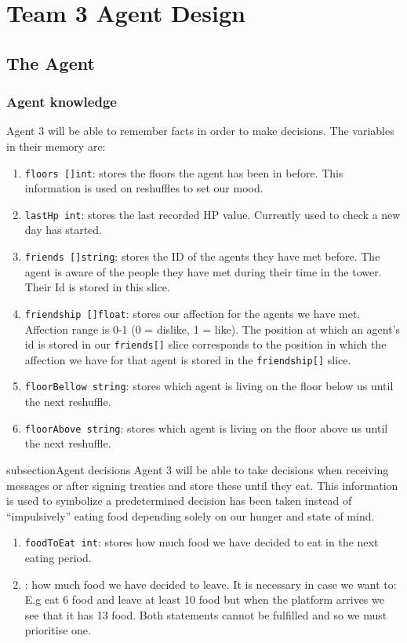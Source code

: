\chapter{Team 3 Agent Design}\label{team_3_agent_design}

\section{The Agent}\label{the_agent}

\subsection{Agent knowledge}
Agent 3 will be able to remember facts in order to make decisions. The variables in their memory are:
\begin{enumerate}
    \item \texttt{floors []int}: stores the floors the agent has been in before. This information is used on reshuffles to set our mood. 
    \item \texttt{lastHp int}: stores the last recorded HP value. Currently used to check a new day has started.
    \item \texttt{friends []string}: stores the ID of the agents they have met before. The agent is aware of the people they have met during their time in the tower. Their Id is stored in this slice. 
    \item \texttt{friendship []float}: stores our affection for the agents we have met. Affection range is 0-1 (0 = dislike, 1 = like). The position at which an agent's id is stored in our \texttt{friends[]} slice corresponds to the position in which the affection we have for that agent is stored in the \texttt{friendship[]} slice.
    \item \texttt{floorBellow string}: stores which agent is living on the floor below us until the next reshuffle.
    \item \texttt{floorAbove string}: stores which agent is living on the floor above us until the next reshuffle. 
  \end{enumerate}

subsection{Agent decisions}
Agent 3 will be able to take decisions when receiving messages or after signing treaties and store these until they eat. This information is used to symbolize a predetermined decision has been taken instead of “impulsively” eating food depending solely on our hunger and state of mind.
\begin{enumerate}
    \item \texttt{foodToEat int}: stores how much food we have decided to eat in the next eating period.
    \item {}: how much food we have decided to leave. It is necessary in case we want to: E.g eat 6 food and leave at least 10 food but when the platform arrives we see that it has 13 food. Both statements cannot be fulfilled and so we must prioritise one.
\end{enumerate}

